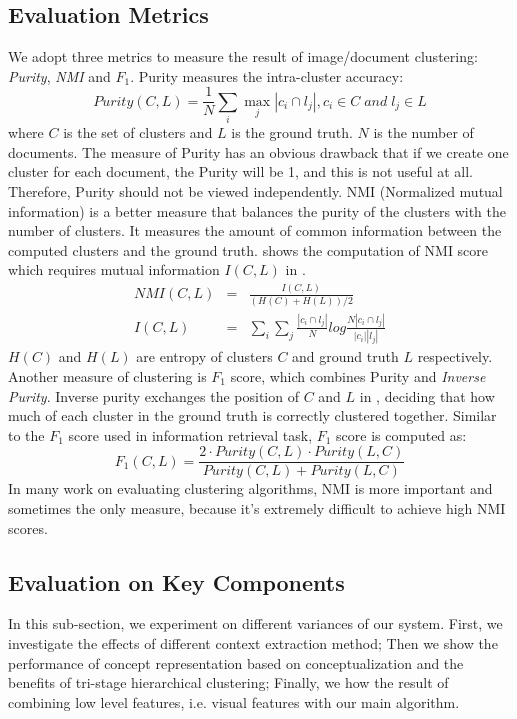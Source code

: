 \subsection{Evaluation Metrics}
We adopt three metrics to measure the result of image/document clustering:
\emph{Purity}, \emph{NMI} and \emph{$F_1$}.
Purity measures the intra-cluster accuracy:
\begin{equation}
\label{equ:purity}
Purity(C,L)=\frac{1}{N}\sum_i{\max_j{|c_i\cap l_j|}}, c_i\in C\;and\;l_j\in L
\end{equation}
where $C$ is the set of clusters and $L$ is the ground truth. $N$ is
the number of documents. The measure of Purity has an obvious drawback
that if we create one cluster for each document, the Purity will be 1, and
this is not useful at all. Therefore, Purity should not be viewed independently.
NMI (Normalized mutual information) is a better measure that
balances the purity of the clusters with the number of clusters.
It measures the amount of common information between the computed clusters and
the ground truth.
 shows the computation of NMI score which requires
mutual information $I(C,L)$ in .
\begin{eqnarray}
NMI(C,L)&=&\frac{I(C,L)}{(H(C)+H(L))/2}
\label{nmi}\\
I(C,L)&=&\sum_i{\sum_j{\frac{|c_i\cap l_j|}{N}log\frac{N|c_i\cap l_j|}{|c_i||l_j|}}}
\label{mi}
\end{eqnarray}
$H(C)$ and $H(L)$ are entropy of clusters $C$ and ground truth $L$ respectively.
Another measure of clustering is $F_1$ score,
which combines Purity and \emph{Inverse Purity}.
Inverse purity exchanges the position of $C$ and $L$ in ,
deciding that how much of each cluster in the ground truth is correctly clustered together.
Similar to the
$F_1$ score used in information retrieval task, $F_1$ score is computed as:
\begin{equation}
F_1(C,L)=\frac{2\cdot Purity(C,L)\cdot Purity(L,C)}{Purity(C,L)+Purity(L,C)}
\end{equation}
In many work on evaluating clustering algorithms, NMI
is more important and sometimes the only measure, because it's extremely
difficult to achieve high NMI scores.

\subsection{Evaluation on Key Components}
In this sub-section, we experiment on different variances of our
system. First, we investigate the effects of different context
extraction method; Then we show the performance of concept
representation based on conceptualization and the benefits of
tri-stage hierarchical clustering; Finally, we how the result of
combining low level features, i.e. visual features with our main
algorithm.

